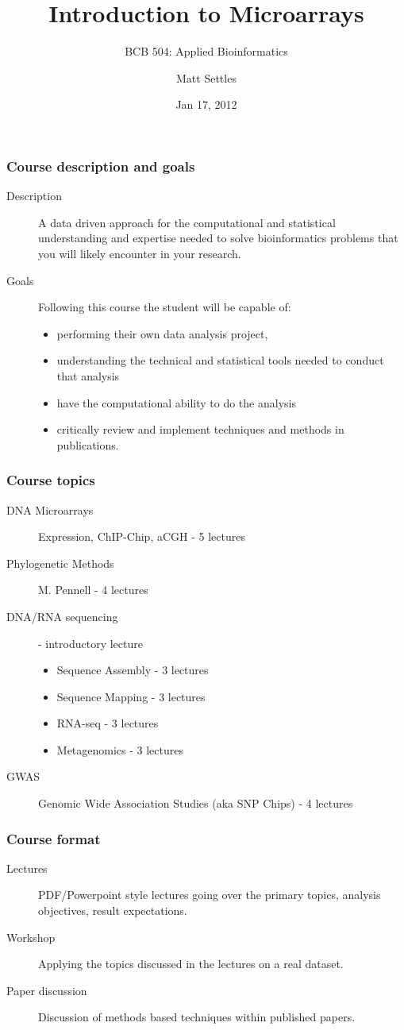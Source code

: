 \documentclass[pdf]{beamer}
\title[Microarrays]{Introduction to Microarrays\\}
\subtitle{BCB 504: Applied Bioinformatics\\}
\author[Matt Settles]{Matt Settles}
\institute{University of Idaho\\ Bioinformatics and Computational Biology Program}
\date{Jan 17, 2012}
\begin{document}
\begin{frame}
\titlepage
\end{frame}


\begin{frame}
	\frametitle{Course description and goals}
	\begin{description}
	\item[Description]
	A data driven approach for the computational and statistical understanding and expertise needed to solve bioinformatics problems that you will likely encounter in your research. 
	\item[Goals]
	Following this course the student will be capable of:
	\begin{itemize} 
		\item performing their own data analysis project, 
		\item understanding the technical and statistical tools needed to conduct that analysis
		\item have the computational ability to do the analysis
		\item critically review and implement techniques and methods in publications.
	\end{itemize}
	\end{description}
\end{frame}

\begin{frame}
	\frametitle{Course topics}
	\begin{description}
		\item[DNA Microarrays] Expression, ChIP-Chip, aCGH - 5 lectures
		\item[Phylogenetic Methods] M. Pennell - 4 lectures
		\item[DNA/RNA sequencing] - introductory lecture 
		\begin{itemize}
			\item Sequence Assembly - 3 lectures
			\item Sequence Mapping - 3 lectures
			\item RNA-seq - 3 lectures
			\item Metagenomics - 3 lectures
		\end{itemize}
		\item[GWAS] Genomic Wide Association Studies (aka SNP Chips) - 4 lectures
	\end{description}
\end{frame}

\begin{frame}
	\frametitle{Course format}
	\begin{description}
		\item[Lectures] PDF/Powerpoint style lectures going over the primary topics, analysis objectives, result expectations.
		\item[Workshop] Applying the topics discussed in the lectures on a real dataset.
		\item[Paper discussion] Discussion of methods based techniques within published papers.
	\end{description}
\end{frame}	
\end{document}
